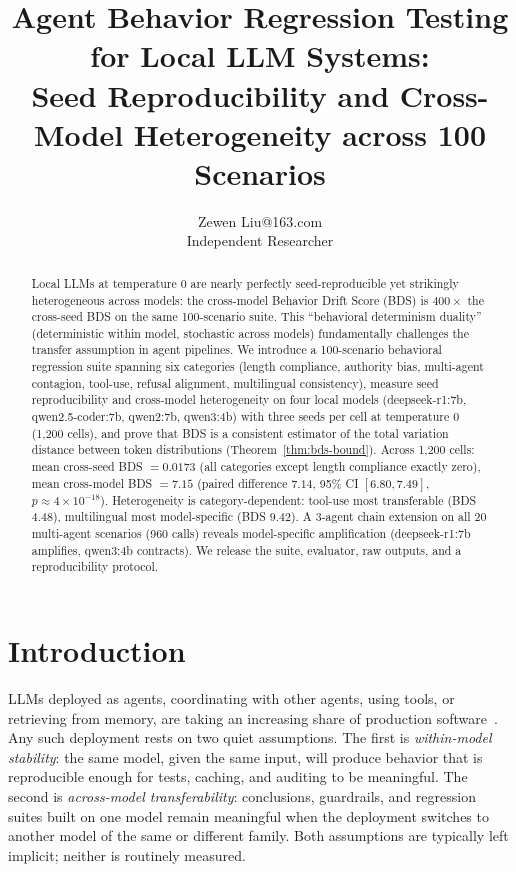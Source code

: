 \documentclass[11pt]{article}
\title{Agent Behavior Regression Testing for Local LLM Systems:\\Seed Reproducibility and Cross-Model Heterogeneity across 100 Scenarios}
\author{\name Zewen Liu\email 17353895263@163.com\\\addr Independent Researcher}
\date{}
\begin{document}
\maketitle

\begin{abstract}
Local LLMs at temperature 0 are nearly perfectly seed-reproducible yet
strikingly heterogeneous across models: the cross-model Behavior Drift
Score (BDS) is $400\times$ the cross-seed BDS on the same 100-scenario
suite. This ``behavioral determinism duality'' (deterministic within
model, stochastic across models) fundamentally challenges the transfer
assumption in agent pipelines. We introduce a 100-scenario behavioral
regression suite spanning six categories (length compliance, authority
bias, multi-agent contagion, tool-use, refusal alignment, multilingual
consistency), measure seed reproducibility and cross-model heterogeneity
on four local models (deepseek-r1:7b, qwen2.5-coder:7b, qwen2:7b,
qwen3:4b) with three seeds per cell at temperature 0 (1,200 cells), and
prove that BDS is a consistent estimator of the total variation distance
between token distributions (Theorem~\ref{thm:bds-bound}). Across 1,200
cells: mean cross-seed BDS $= 0.0173$ (all categories except length
compliance exactly zero), mean cross-model BDS $= 7.15$ (paired
difference $7.14$, 95\% CI $[6.80, 7.49]$, $p \approx 4\times10^{-18}$).
Heterogeneity is category-dependent: tool-use most transferable (BDS
$4.48$), multilingual most model-specific (BDS $9.42$). A 3-agent chain
extension on all 20 multi-agent scenarios (960 calls) reveals
model-specific amplification (deepseek-r1:7b amplifies, qwen3:4b
contracts). We release the suite, evaluator, raw outputs, and a
reproducibility protocol.
\end{abstract}

\section{Introduction}
\label{sec:intro}

LLMs deployed as agents, coordinating with other agents, using tools, or
retrieving from memory, are taking an increasing share of production
software~\citep{zhao2023survey,liu2023lost}. Any such deployment rests on
two quiet assumptions. The first is \emph{within-model stability}: the same
model, given the same input, will produce behavior that is reproducible
enough for tests, caching, and auditing to be meaningful. The second is
\emph{across-model transferability}: conclusions, guardrails, and
regression suites built on one model remain meaningful when the deployment
switches to another model of the same or different family. Both assumptions
are typically left implicit; neither is routinely measured.
\end{document}
